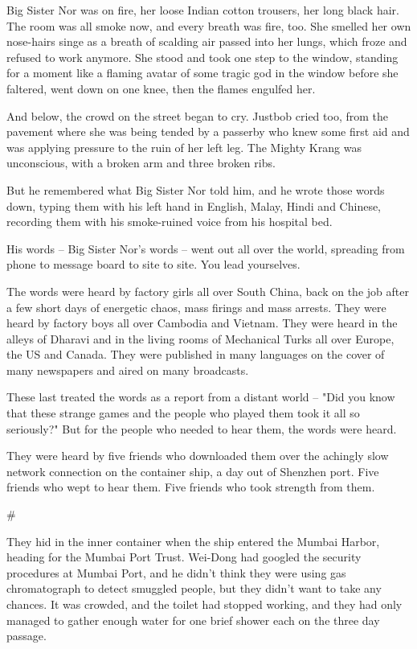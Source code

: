 Big Sister Nor was on fire, her loose Indian cotton trousers, her
long black hair. The room was all smoke now, and every breath was
fire, too. She smelled her own nose-hairs singe as a breath of
scalding air passed into her lungs, which froze and refused to work
anymore. She stood and took one step to the window, standing for a
moment like a flaming avatar of some tragic god in the window
before she faltered, went down on one knee, then the flames
engulfed her.

And below, the crowd on the street began to cry. Justbob cried too,
from the pavement where she was being tended by a passerby who knew
some first aid and was applying pressure to the ruin of her left
leg. The Mighty Krang was unconscious, with a broken arm and three
broken ribs.

But he remembered what Big Sister Nor told him, and he wrote those
words down, typing them with his left hand in English, Malay, Hindi
and Chinese, recording them with his smoke-ruined voice from his
hospital bed.

His words -- Big Sister Nor's words -- went out all over the world,
spreading from phone to message board to site to site. You lead
yourselves.

The words were heard by factory girls all over South China, back on
the job after a few short days of energetic chaos, mass firings and
mass arrests. They were heard by factory boys all over Cambodia and
Vietnam. They were heard in the alleys of Dharavi and in the living
rooms of Mechanical Turks all over Europe, the US and Canada. They
were published in many languages on the cover of many newspapers
and aired on many broadcasts.

These last treated the words as a report from a distant world --
"Did you know that these strange games and the people who played
them took it all so seriously?" But for the people who needed to
hear them, the words were heard.

They were heard by five friends who downloaded them over the
achingly slow network connection on the container ship, a day out
of Shenzhen port. Five friends who wept to hear them. Five friends
who took strength from them.

\#

They hid in the inner container when the ship entered the Mumbai
Harbor, heading for the Mumbai Port Trust. Wei-Dong had googled the
security procedures at Mumbai Port, and he didn't think they were
using gas chromatograph to detect smuggled people, but they didn't
want to take any chances. It was crowded, and the toilet had
stopped working, and they had only managed to gather enough water
for one brief shower each on the three day passage.

